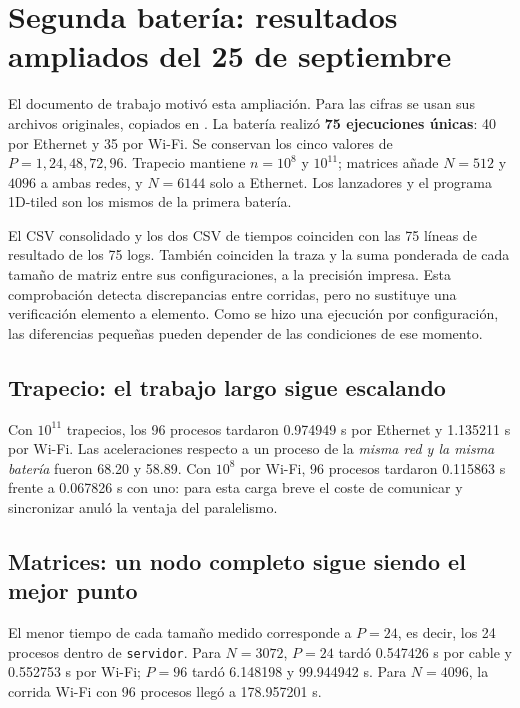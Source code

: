 \section{Segunda batería: resultados ampliados del 25 de septiembre}

El documento de trabajo  motivó esta ampliación. Para las cifras se usan sus archivos originales, copiados en . La batería realizó \textbf{75 ejecuciones únicas}: 40 por Ethernet y 35 por Wi-Fi. Se conservan los cinco valores de $P=1,24,48,72,96$. Trapecio mantiene $n=10^8$ y $10^{11}$; matrices añade $N=512$ y $4096$ a ambas redes, y $N=6144$ solo a Ethernet. Los lanzadores y el programa 1D-tiled son los mismos de la primera batería.

El CSV consolidado y los dos CSV de tiempos coinciden con las 75 líneas de resultado de los 75 logs. También coinciden la traza y la suma ponderada de cada tamaño de matriz entre sus configuraciones, a la precisión impresa. Esta comprobación detecta discrepancias entre corridas, pero no sustituye una verificación elemento a elemento. Como se hizo una ejecución por configuración, las diferencias pequeñas pueden depender de las condiciones de ese momento.

\subsection{Trapecio: el trabajo largo sigue escalando}


Con $10^{11}$ trapecios, los 96 procesos tardaron 0.974949 s por Ethernet y 1.135211 s por Wi-Fi. Las aceleraciones respecto a un proceso de la \emph{misma red y la misma batería} fueron 68.20 y 58.89. Con $10^8$ por Wi-Fi, 96 procesos tardaron 0.115863 s frente a 0.067826 s con uno: para esta carga breve el coste de comunicar y sincronizar anuló la ventaja del paralelismo.

\subsection{Matrices: un nodo completo sigue siendo el mejor punto}


El menor tiempo de cada tamaño medido corresponde a $P=24$, es decir, los 24 procesos dentro de \texttt{servidor}. Para $N=3072$, $P=24$ tardó 0.547426 s por cable y 0.552753 s por Wi-Fi; $P=96$ tardó 6.148198 y 99.944942 s. Para $N=4096$, la corrida Wi-Fi con 96 procesos llegó a 178.957201 s.

